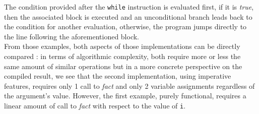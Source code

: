 The condition provided after the \texttt{while} instruction is evaluated first, if it is \textsl{true}, then the associated block is executed and an unconditional branch leads back to the condition for another evaluation, otherwise, the program jumps directly to the line following the aforementioned block.\\


From those examples, both aspects of those implementations can be directly compared : in terms of algorithmic complexity, both require more or less the same amount of similar operations but in a more concrete perspective on the compiled result, we see that the second implementation, using imperative features, requires only 1 call to \textsl{fact} and only 2 variable assignments regardless of the argument's value. However, the first example, purely functional, requires a linear amount of call to \textsl{fact} with respect to the value of \texttt{i}.
